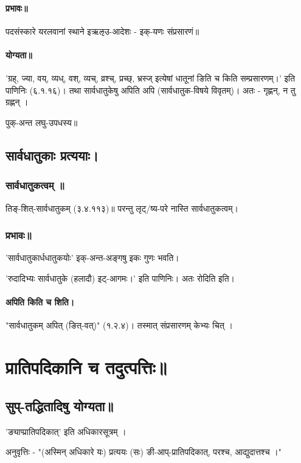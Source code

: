 \documentclass[oneside, article]{memoir}
\begin{document}
\subsubsection{प्रभावः॥}
पदसंस्कारे यरलवानां स्थाने इऋऌउ-आदेशः - इक्-यणः संप्रसारणं॥

\subsubsection{योग्यता॥}
'ग्रह्, ज्या, वय्, व्यध्, वश्, व्यच्, व्रश्च्, प्रच्छ्, भ्रस्ज्
इत्येषां धातूनां ङिति च किति सम्प्रसारणम्।' इति पाणिनिः (६.१.१६)। तथा सार्वधातुकेषु अपिति अपि (सार्वधातुक-विषये विवृतम्)। अतः - गृह्णन्, न तु ग्रह्णन् ।


पुक्-अन्त लघु-उपधस्य॥

\section{सार्वधातुकाः प्रत्ययाः।}

\subsection{सार्वधातुकत्वम् ॥}
तिङ्-शित्-सार्वधातुकम् (३.४.११३)॥ परन्तु लृट्/ष्य-परे नास्ति सार्वधातुकत्वम्।

\subsection{प्रभावः॥}
'सार्वधातुकार्धधातुकयोः' इक्-अन्त-अङ्गषु इकः गुणः भवति।

'रुदादिभ्यः सार्वधातुके (हलादौ) इट्-आगमः।' इति पाणिनिः। अतः रोदिति इति।

\subsubsection{अपिति किति च शिति।}
"सार्वधातुकम् अपित् (ङित्-वत्)" (१.२.४)। तस्मात् संप्रसारणम् केभ्यः चित् ।


\chapter{प्रातिपदिकानि च तदुत्पत्तिः॥}
\section{सुप्-तद्धितादिषु योग्यता॥}
'ङ्याप्प्रातिपदिकात्' इति अधिकारसूत्रम् ।

अनुवृत्तिः - "(अस्मिन् अधिकारे यः) प्रत्ययः (सः) ङी-आप्-प्रातिपदिकात्, परश्च, आद्युदात्तश्च ।"
\end{document}
